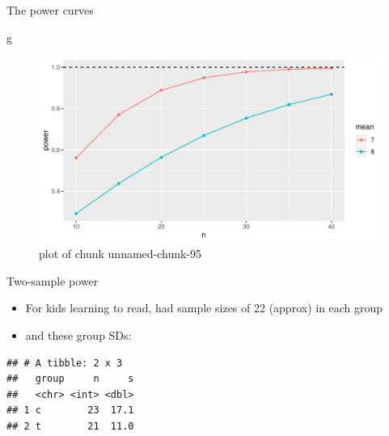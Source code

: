 \documentclass[ignorenonframetext,]{beamer}
\newenvironment{Shaded}{\begin{snugshade}}{\end{snugshade}}
\newcommand{\DataTypeTok}[1]{\textcolor[rgb]{0.13,0.29,0.53}{#1}}
\newcommand{\KeywordTok}[1]{\textcolor[rgb]{0.13,0.29,0.53}{\textbf{#1}}}
\newcommand{\NormalTok}[1]{#1}
\newcommand{\OperatorTok}[1]{\textcolor[rgb]{0.81,0.36,0.00}{\textbf{#1}}}
\newcommand{\StringTok}[1]{\textcolor[rgb]{0.31,0.60,0.02}{#1}}
\providecommand{\tightlist}{%
  \setlength{\itemsep}{0pt}\setlength{\parskip}{0pt}}
\begin{document}
\begin{frame}[fragile]{The power curves}
\protect\hypertarget{the-power-curves-1}{}

\begin{Shaded}
\begin{Highlighting}[]
\NormalTok{g}
\end{Highlighting}
\end{Shaded}

\begin{figure}
\centering
\includegraphics{figure/unnamed-chunk-95-1.pdf}
\caption{plot of chunk unnamed-chunk-95}
\end{figure}

\end{frame}

\begin{frame}[fragile]{Two-sample power}
\protect\hypertarget{two-sample-power}{}

\begin{itemize}
\tightlist
\item
  For kids learning to read, had sample sizes of 22 (approx) in each
  group
\item
  and these group SDs:
\end{itemize}

\begin{Shaded}
\end{Shaded}

\begin{verbatim}
## # A tibble: 2 x 3
##   group     n     s
##   <chr> <int> <dbl>
## 1 c        23  17.1
## 2 t        21  11.0
\end{verbatim}

\end{frame}
\end{document}
